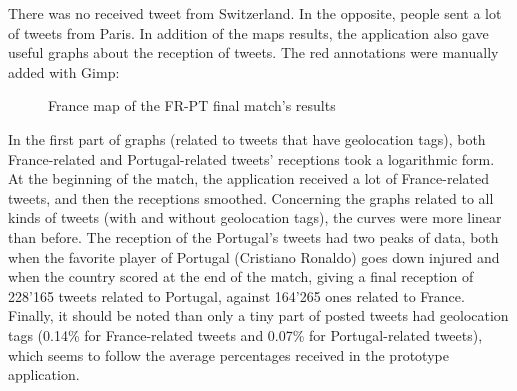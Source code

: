 \documentclass[a4paper,11pt]{report}
\begin{document}
There was no received tweet from Switzerland. In the opposite, people sent a lot of tweets from Paris. In addition of the maps results, the application also gave useful graphs about the reception of tweets. The red annotations were manually added with Gimp:
\begin{figure}[H]
\vspace{-5pt}
\begin{center}
\vspace{-20pt}
\caption{France map of the FR-PT final match's results}
\end{center}
\end{figure}
\vspace{-10pt}

In the first part of graphs (related to tweets that have geolocation tags), both France-related and Portugal-related tweets' receptions took a logarithmic form. At the beginning of the match, the application received a lot of France-related tweets, and then the receptions smoothed.
Concerning the graphs related to all kinds of tweets (with and without geolocation tags), the curves were more linear than before. The reception of the Portugal's tweets had two peaks of data, both when the favorite player of Portugal (Cristiano Ronaldo) goes down injured and when the country scored at the end of the match, giving a final reception of 228'165 tweets related to Portugal, against 164'265 ones related to France. Finally, it should be noted than only a tiny part of posted tweets had geolocation tags (0.14\% for France-related tweets and 0.07\% for Portugal-related tweets), which seems to follow the average percentages received in the prototype application.
\end{document}
